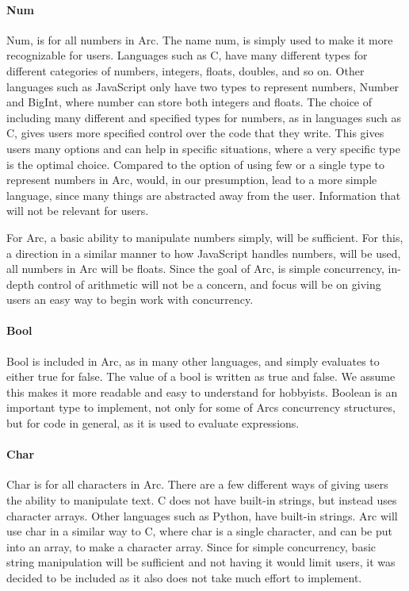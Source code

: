 \paragraph*{Num}
Num, is for all numbers in Arc. The name num, is simply used to make it more recognizable for users. Languages such as C, have many different types for different categories of numbers, integers, floats, doubles, and so on. Other languages such as JavaScript only have two types to represent numbers, Number and BigInt, where number can store both integers and floats.
The choice of including many different and specified types for numbers, as in languages such as C, gives users more specified control over the code that they write. This gives users many options and can help in specific situations, where a very specific type is the optimal choice.
Compared to the option of using few or a single type to represent numbers in Arc, would, in our presumption, lead to a more simple language, since many things are abstracted away from the user. Information that will not be relevant for users.

For Arc, a basic ability to manipulate numbers simply, will be sufficient. For this, a direction in a similar manner to how JavaScript handles numbers, will be used, all numbers in Arc will be floats. Since the goal of Arc, is simple concurrency, in-depth control of arithmetic will not be a concern, and focus will be on giving users an easy way to begin work with concurrency.

\paragraph*{Bool}
Bool is included in Arc, as in many other languages, and simply evaluates to either true for false. The value of a bool is written as true and false. We assume this makes it more readable and easy to understand for hobbyists. Boolean is an important type to implement, not only for some of Arcs concurrency structures, but for code in general, as it is used to evaluate expressions. 

\paragraph*{Char}
Char is for all characters in Arc. There are a few different ways of giving users the ability to manipulate text. C does not have built-in strings, but instead uses character arrays. Other languages such as Python, have built-in strings. Arc will use char in a similar way to C, where char is a single character, and can be put into an array, to make a character array. Since for simple concurrency, basic string manipulation will be sufficient and not having it would limit users, it was decided to be included as it also does not take much effort to implement. 



